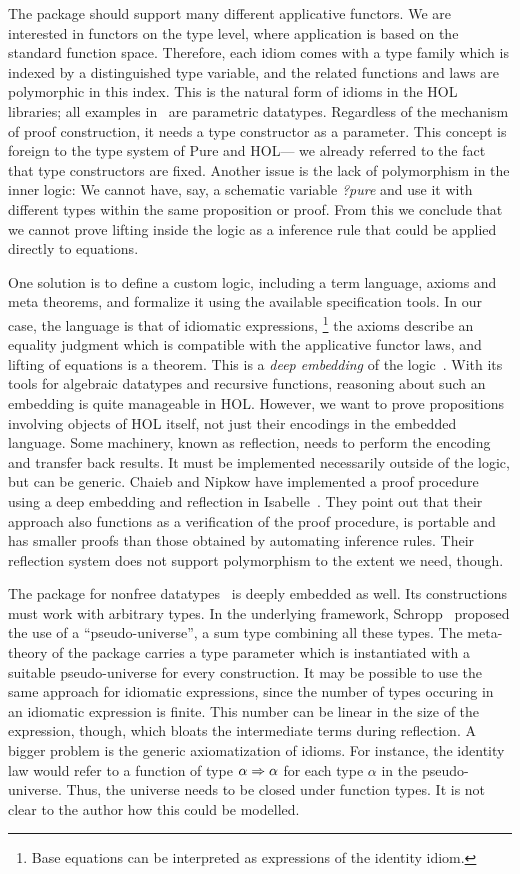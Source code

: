 The package should support many different applicative functors.
We are interested in functors on the type level, where application is based on
the standard function space.
Therefore, each idiom comes with a type family which is indexed by a
distinguished type variable, and the related functions and laws are polymorphic
in this index.
This is the natural form of idioms in the HOL libraries; all examples in \todo\
are parametric datatypes.  %
Regardless of the mechanism of proof construction, it needs a type constructor
as a parameter.
This concept is foreign to the type system of Pure and HOL---%
we already referred to the fact that type constructors are fixed.
Another issue is the lack of polymorphism in the inner logic:
We cannot have, say, a schematic variable \textit{?pure} and use it with
different types within the same proposition or proof.
From this we conclude that we cannot prove lifting inside the logic as a
inference rule that could be applied directly to equations.

One solution is to define a custom logic, including a term language, axioms
and meta theorems, and formalize it using the available specification tools.
In our case, the language is that of idiomatic expressions,%
\footnote{Base equations can be interpreted as expressions of the identity idiom.}
the axioms describe an equality judgment which is compatible with the
applicative functor laws, and lifting of equations is a theorem.
This is a \emph{deep embedding} of the logic~\cite{wildmoser04}.
With its tools for algebraic datatypes and recursive functions, reasoning about
such an embedding is quite manageable in HOL.
However, we want to prove propositions involving objects of HOL itself, not just
their encodings in the embedded language.
Some machinery, known as reflection, needs to perform the encoding and transfer
back results.
It must be implemented necessarily outside of the logic, but can be generic.
Chaieb and Nipkow have implemented a proof procedure using a deep embedding and
reflection in Isabelle~\cite{chaieb05}.
They point out that their approach also functions as a verification of the
proof procedure, is portable and has smaller proofs than those obtained by
automating inference rules.
Their reflection system does not support polymorphism to the extent we need,
though.

The package for nonfree datatypes~\cite{schropp13} is deeply embedded as well.
Its constructions must work with arbitrary types.
In the underlying framework, Schropp~\cite{schropp12} proposed the use of a
``pseudo-universe'', a sum type combining all these types.
The meta-theory of the package carries a type parameter which is instantiated
with a suitable pseudo-universe for every construction.
It may be possible to use the same approach for idiomatic expressions, since the
number of types occuring in an idiomatic expression is finite.
This number can be linear in the size of the expression, though, which bloats
the intermediate terms during reflection.
A bigger problem is the generic axiomatization of idioms.
For instance, the identity law would refer to a function of type $\alpha \Rightarrow \alpha$
for each type $\alpha$ in the pseudo-universe.
Thus, the universe needs to be closed under function types.
It is not clear to the author how this could be modelled.

